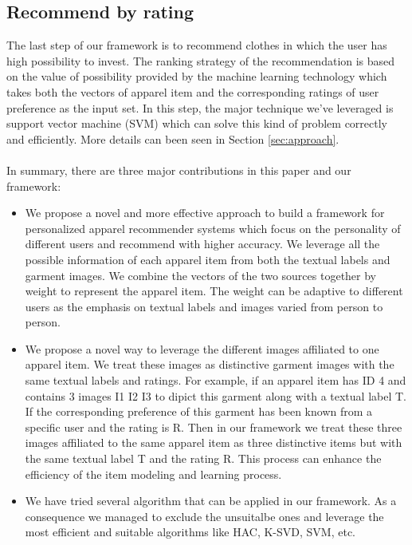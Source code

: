 \subsection{Recommend by rating}
The last step of our framework is to recommend clothes in which the user has high possibility to invest. The ranking strategy of the recommendation is based on the value of possibility provided by the machine learning technology which takes both the vectors of apparel item and the corresponding ratings of user preference as the input set. In this step, the major technique we've leveraged is support vector machine (SVM) which can solve this kind of problem correctly and efficiently. More details can been seen in Section \ref{sec:approach}.\\
\\
In summary, there are three major contributions in this paper and our framework:
\begin{itemize}
	\item We propose a novel and more effective approach to build a framework for personalized apparel recommender systems which focus on the personality of different users and recommend with higher accuracy. We leverage all the possible information of each apparel item from both the textual labels and garment images. We combine the vectors of the two sources together by weight to represent the apparel item. The weight can be adaptive to different users as the emphasis on textual labels and images varied from person to person.
	\item We propose a novel way to leverage the different images affiliated to one apparel item. We treat these images as distinctive garment images with the same textual labels and ratings. For example, if an apparel item has ID 4 and contains 3 images I1 I2 I3 to dipict this garment along with a textual label T. If the corresponding preference of this garment has been known from a specific user and the rating is R. Then in our framework we treat these three images affiliated to the same
        apparel item as three distinctive items but with the same textual label T and the rating R. This process can enhance the efficiency of the item modeling and learning process.
	\item We have tried several algorithm that can be applied in our framework. As a consequence we managed to exclude the unsuitalbe ones and leverage the most efficient and suitable algorithms like HAC, K-SVD, SVM, etc.
\end{itemize}
